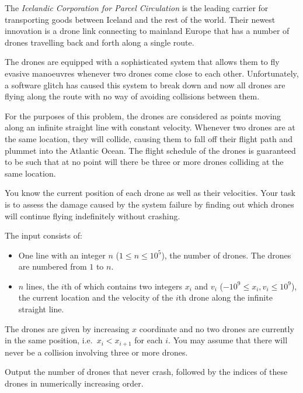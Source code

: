 
\providecommand{\maxn}{}
\renewcommand{\maxn}{10^5}
\providecommand{\maxx}{}
\renewcommand{\maxx}{10^9}

%
The \emph{Icelandic Corporation for Parcel Circulation} is the leading carrier
for transporting goods between Iceland and the rest of the world. Their newest
innovation is a drone link connecting to mainland Europe that has a number of
drones travelling back and forth along a single route.

The drones are equipped with a sophisticated system that allows them to fly
evasive manoeuvres whenever two drones come close to each other. Unfortunately,
a software glitch has caused this system to break down and now all drones are
flying along the route with no way of avoiding collisions between them.

For the purposes of this problem, the drones are considered as points moving
along an infinite straight line with constant velocity. Whenever two drones are
at the same location, they will collide, causing them to fall off their flight
path and plummet into the Atlantic Ocean. The flight schedule of the drones is
guaranteed to be such that at no point will there be three or more drones colliding at
the same location.

You know the current position of each drone as well as their velocities. Your
task is to assess the damage caused by the system failure by finding out which
drones will continue flying indefinitely without crashing.

\begin{Input}
The input consists of:
\begin{itemize}
  \item One line with an integer $n$ ($1 \leq n \leq \maxn$), the number of
    drones. The drones are numbered from $1$ to $n$.
  \item $n$ lines, the $i$th of which contains two integers $x_i$ and $v_i$
    ($-\maxx \leq x_i,v_i \leq \maxx$), the current location and the velocity
    of the $i$th drone along the infinite straight line.
\end{itemize}

The drones are given by increasing $x$ coordinate and no two drones are currently
in the same position, i.e.\ $x_i < x_{i+1}$ for each $i$. You may
assume that there will never be a collision involving three or more drones.
\end{Input}

\begin{Output}
Output the number of drones that never crash, followed by the indices of these
drones in numerically increasing order.
\end{Output}

